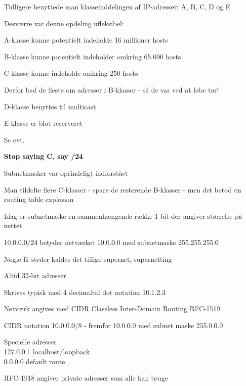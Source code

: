 \documentclass[Screen16to9,17pt]{foils}
\begin{document}
\begin{list1}
\item Tidligere benyttede man klasseinddelingen af IP-adresser: A, B, C, D og E
\item Desværre var denne opdeling ufleksibel:
\begin{list2}
\item A-klasse kunne potentielt indeholde 16 millioner hosts
\item B-klasse kunne potentielt indeholder omkring 65.000 hosts
\item C-klasse kunne indeholde omkring 250 hosts
\end{list2}
\item Derfor bad de fleste om adresser i B-klasser - så de var ved at løbe tør!
\item D-klasse benyttes til multicast
\item E-klasse er blot reserveret
\item Se evt. 
\end{list1}

\vskip 5mm
\centerline{\bf Stop saying C, say /24}



\begin{list1}
\item Subnetmasker var oprindeligt indforstået
\item Man tildelte flere C-klasser - spare de resterende B-klasser - men det betød en routing table explosion
\item Idag er subnetmaske en sammenhængende række 1-bit der angiver størrelse på nettet
\item 10.0.0.0/24 betyder netværket 10.0.0.0 med subnetmaske 255.255.255.0
\item Nogle få steder kaldes det tillige supernet, supernetting
\end{list1}



\begin{list2}
\item Altid 32-bit adresser
\item Skrives typisk med 4 decimaltal dot notation 10.1.2.3
\item Netværk angives med CIDR Classless Inter-Domain Routing RFC-1519
\item CIDR notation 10.0.0.0/8 -
  fremfor 10.0.0.0 med subnet maske 255.0.0.0
\item Specielle adresser\\
127.0.0.1 localhost/loopback\\
0.0.0.0  default route
\item RFC-1918 angiver private adresser som alle kan bruge
\end{list2}
\end{document}
